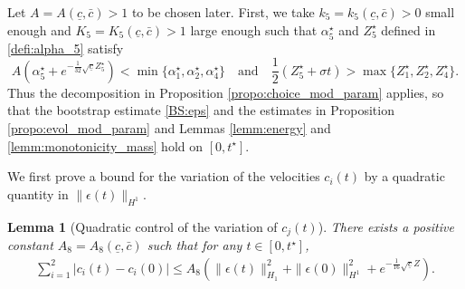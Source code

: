 \documentclass[reqno,10pt]{amsart}
\newtheorem{lemm}{Lemma}[section]
\numberwithin{equation}{section}
\begin{document}
Let $A=A(\underline{c},\bar{c})>1$ to be chosen later.  First, we take $k_5=k_5(\underline{c},\bar{c})>0$ small enough and $K_5=K_5(\underline{c},\bar{c})>1$ large enough such that $\alpha_5^{\star}$ and $Z_5^{\star}$ defined in \eqref{defi:alpha_5} satisfy 
\begin{equation} \label{cond:alpha5}
A \left( \alpha_5^{\star} + e^{-\frac{1}{32} \sqrt{\underline{c}}Z_5^{\star} }  \right)< \min\{\alpha_1^{\star},\alpha_2^{\star},\alpha_4^{\star}\} \quad \text{and} \quad \frac12 (Z_5^{\star}+\sigma t)>\max\{Z_1^{\star},Z_2^{\star},Z_4^{\star}\}. 
\end{equation}
Thus the decomposition in Proposition \ref{propo:choice_mod_param} applies, so that the bootstrap estimate \eqref{BS:eps} and the estimates in Proposition \ref{propo:evol_mod_param} and Lemmas \ref{lemm:energy} and \ref{lemm:monotonicity_mass} hold on $[0,t^{\star}]$.  

	
We first prove a bound for the variation of the velocities $c_i(t)$ by a quadratic quantity in $\|\epsilon(t)\|_{H^1}$. 

 
 
	\begin{lemm}[Quadratic control of the variation of $c_j(t)$]\label{lemm:quadra_control_error}
		There exists a positive constant $A_8=A_8(\underline{c}, \bar{c})$ such that for any $t\in [0, t^\star]$,
		\begin{align} \label{lemm:quadra_control_error.1}
			\sum_{i=1}^2 \left\vert c_i(t) -c_i(0) \right\vert \leq A_8  \left( \| \epsilon(t) \|_{H_1}^2 + \| \epsilon (0) \|_{H^1}^2 + e^{-\frac1{16} \sqrt{\underline{c}} Z}\right).
		\end{align}
	\end{lemm}
	
\end{document}
